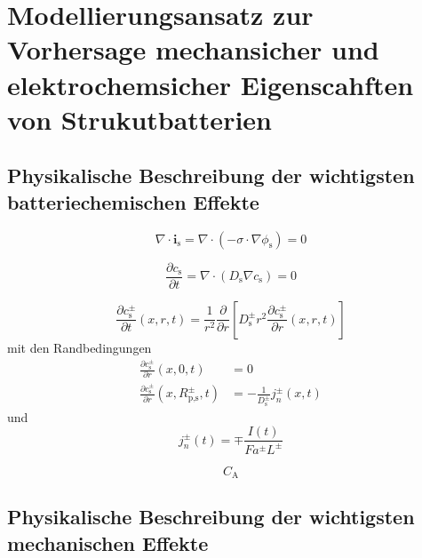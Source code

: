 \chapter{Modellierungsansatz zur Vorhersage mechansicher und elektrochemsicher Eigenscahften von Strukutbatterien}


\section{Physikalische Beschreibung der wichtigsten batteriechemischen Effekte}


\begin{equation}
    \nabla \cdot \boldsymbol{i}_{\text{s}} = \nabla \cdot \left( - \sigma \cdot \nabla \phi_{\text{s}} \right) = 0
\end{equation}

\begin{equation}
    \frac{\partial c_{\text{s}}}{\partial t}  = \nabla \cdot \left( D_{\text{s}} \nabla c_{\text{s}} \right) = 0
\end{equation}


\begin{equation}
    \frac{\partial c_{\text{s}}^{\pm}}{\partial t}(x,r,t) = \frac{1}{r^2} \frac{\partial}{ \partial r} \left[ D_{\text{s}}^\pm r^2 \frac{\partial c_{\text{s}}^\pm}{\partial r}(x,r,t)\right]
\end{equation}
mit den Randbedingungen
\begin{align}
    \frac{\partial c_{\text{s}}^{\pm}}{\partial r}(x,0,t) &= 0 \\
    \frac{\partial c_{\text{s}}^{\pm}}{\partial r}(x,R_{\text{p,s}}^{\pm},t) &= -\frac{1}{ D_{\text{s}}^\pm} j_{n}^{\pm}(x,t)
\end{align}
und
\begin{equation}
j_{n}^{\pm}(t) = \mp \frac{I(t)}{F a^{\pm} L^{\pm}}
\end{equation}


\begin{equation}
    C_{\text{A}}
\end{equation}


\section{Physikalische Beschreibung der wichtigsten mechanischen Effekte}

